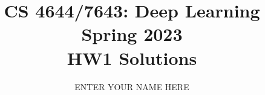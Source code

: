 \documentclass[11pt,english]{article}
\begin{document}
\title{CS 4644/7643: Deep Learning \\
Spring 2023\\ HW1 Solutions}
\author{ENTER YOUR NAME HERE}
\maketitle


\end{document}
